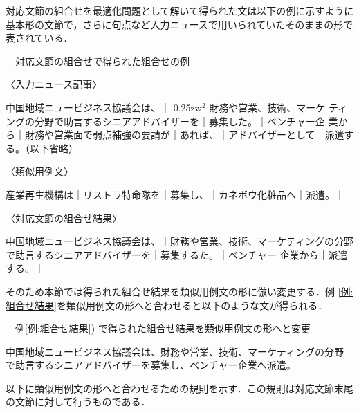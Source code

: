 \documentclass[japanese]{jnlp_1.4}
\newcounter{exp}
\def\exp#1{}
\begin{document}
対応文節の組合せを最適化問題として解いて得られた文は以下の例に示すように
基本形の文節で，さらに句点など入力ニュースで用いられていたそのままの形で
表されている．
\begin{screen}
\exp{例:組合せ結果}　対応文節の組合せで得られた組合せの例

〈入力ニュース記事〉

{\setlength{\leftskip}{2zw}
    中国地域ニュービジネス協議会は、｜\kern-0.25zw$^{2}$ 財務や営業、技術、マーケ
ティングの分野で助言するシニアアドバイザーを｜募集した。｜ベンチャー企
業から｜財務や営業面で弱点補強の要請が｜あれば、｜アドバイザーとして｜派遣する。（以下省略）
\par}

〈類似用例文〉

{\setlength{\leftskip}{2zw}
産業再生機構は｜リストラ特命隊を｜募集し、｜カネボウ化粧品へ｜派遣。｜
\par}

〈対応文節の組合せ結果〉

{\setlength{\leftskip}{2zw}
中国地域ニュービジネス協議会は、｜財務や営業、技術、マーケティングの分野
で助言するシニアアドバイザーを｜募集する\footnotemark た。｜ベンチャー
企業から｜派遣する。｜
\par}
\end{screen}


そのため本節では得られた組合せ結果を類似用例文の形に倣い変更する．例
\ref{例:組合せ結果}を類似用例文の形へと合わせると以下のような文が得られる．


\begin{screen}
\exp{nolabel03}　例\ref{例:組合せ結果}) で得られた組合せ結果を類似用例文の形へと変更

中国地域ニュービジネス協議会は、財務や営業、技術、マーケティングの分野
で助言するシニアアドバイザーを募集し、ベンチャー企業へ派遣。

\end{screen}

以下に類似用例文の形へと合わせるための規則を示す．この規則は対応文節末尾
の文節に対して行うものである．
\end{document}
